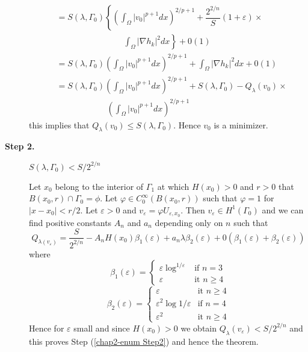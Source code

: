 \begin{description}
\begin{align*}
&= S(\lambda, \Gamma_{0}) \left\{\left(\int_{\Omega}|v_{0}|^{p+1}dx\right)^{2/p+1} +\dfrac{2^{2/n}}{S}(1 +              \varepsilon)\times \right. \\
&\qquad\qquad\qquad\qquad \left.\int_{\Omega}|\nabla h_{k}|^{2}dx\right\} + 0(1)\\
&= S(\lambda, \Gamma_{0}) \left(\int_{\Omega}|v_{0}|^{p+1}dx\right)^{2/p+1} + \int_{\Omega}|\nabla h_{k}|^{2}dx + 0(1)\\
&= S(\lambda, \Gamma_{0}) \left(\int_{\Omega}|v_{0}|^{p+1}dx\right)^{2/p+1} + S(\lambda, \Gamma_{0})-Q_{\lambda}(v_{0}) \times \\
&\qquad \qquad \qquad \left(\int_{\Omega}|v_{0}|^{p+1}dx\right)^{2/p+1} 
\end{align*}\pageoriginale
this implies that $Q_{\lambda}(v_{0}) \leq S(\lambda,\Gamma_{0})$. Hence $v_{0}$ is a minimizer.

\item[{\rm \bf Step 2.}] $S(\lambda, \Gamma_{0}) < S/2^{2/n}$\label{chap2-enum Step2}

Let $x_{0}$ belong to the interior of $\Gamma_{1}$ at which $H(x_{0}) > 0 $ and $r > 0$ that $B(x_{0}, r) \cap \Gamma_{0} = \phi$. Let $\varphi \in C_{0}^{\infty}(B(x_{0}, r))$ such that $\varphi = 1$ for $|x-x_{0}| < r/2$. Let $\varepsilon > 0$ and $v_{\varepsilon}  = \varphi U_{\varepsilon, x_{0}}$. Then $v_{\varepsilon} \in H^{1}(\Gamma_{0})$ and we can find positive constants $A_{n}$ and $a_{n}$ depending only on $n$ such that      
\begin{equation}
Q_{\lambda(v_{\varepsilon})} = \dfrac{S}{2^{2/n}} -A_{n}H(x_{0})\beta_{1}(\varepsilon) + a_{n}\lambda \beta_{2}(\varepsilon) + 0(\beta_{1}(\varepsilon) + \beta_{2}(\varepsilon))\tag{10}\label{chap2-eq10}
\end{equation}
where
\begin{equation*}
\beta_{1}(\varepsilon) = 
\begin{cases}
\varepsilon \log^{1/\varepsilon} & \text{if $n =3$}\\
\varepsilon & \text{it $n\geq 4$}
\end{cases}
\end{equation*}
\begin{equation*}
\beta_{2}(\varepsilon) = 
\begin{cases}
\varepsilon & \text{it $n\geq 4$}\\
\varepsilon^{2} \log{1/\varepsilon} & \text{if $n =4$}\\
\varepsilon^{2} & \text{it $n\geq 4$}
\end{cases}
\end{equation*}
Hence for $\varepsilon$ small and since $H(x_{0}) > 0$ we obtain $Q_{\lambda}(v_{\varepsilon}) < S/2^{2/n}$ and this proves Step (\ref{chap2-enum Step2}) and hence the theorem.
\end{description}

